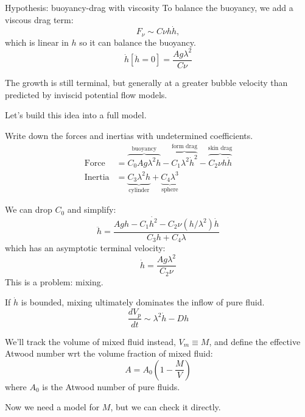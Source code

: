 \documentclass[12pt]{beamer}
\begin{document}
\begin{frame}{Hypothesis: buoyancy-drag with viscosity}
To balance the buoyancy, we add a viscous drag term:
\begin{equation*}
F_\nu \sim C \nu h \dot{h},
\end{equation*}
which is linear in $h$ so it can balance the buoyancy.
\begin{equation*}
\dot{h}\left[\ddot{h} = 0\right] = \frac{A g \lambda^2}{C \nu}
\end{equation*}
\pause

The growth is still terminal, but generally at a greater bubble velocity than predicted by inviscid potential flow models.
\vspace{20pt} \pause
\begin{exampleblock}{}
Let's build this idea into a full model.
\end{exampleblock}
\end{frame}

\begin{frame}
Write down the forces and inertias with undetermined coefficients.
\begin{align*}
\text{Force} &= \overbrace{C_0 A g \lambda^2 h}^{\text{buoyancy}} - \overbrace{C_1 \lambda^2 \dot{h}^2}^{\text{form drag}} - \overbrace{C_2 \nu h \dot{h}}^{\text{skin drag}} \\
\text{Inertia} &= \underbrace{C_3 \lambda^2 h}_{\text{cylinder}} + \underbrace{C_4 \lambda^3}_{\text{sphere}}
\end{align*}\pause

We can drop $C_0$ and simplify:
\begin{equation*}
\ddot{h} = \frac{A g h - C_1 \dot{h^2} - C_2 \nu (h/\lambda^2) \dot{h}}{C_3 h + C_4 \lambda}
\end{equation*}
which has an asymptotic terminal velocity:
\begin{equation*}
\dot{h} = \frac{A g \lambda^2}{C_2 \nu}
\end{equation*}\pause
This is a problem: mixing.
\end{frame}

\begin{frame}
If $\dot{h}$ is bounded, mixing ultimately dominates the inflow of pure fluid.
\begin{equation*}
\frac{d V_p}{dt} \sim \lambda^2 \dot{h} - D h 
\end{equation*}
\pause

We'll track the volume of mixed fluid instead, $V_m \equiv M$, and define the effective Atwood number wrt the volume fraction of mixed fluid:
\begin{equation*}
A = A_0 \left(1 - \frac{M}{V}\right)
\end{equation*}
where $A_0$ is the Atwood number of pure fluids.
\vspace{20pt} \pause

Now we need a model for $M$, but we can check it directly.
\end{frame}
\end{document}

